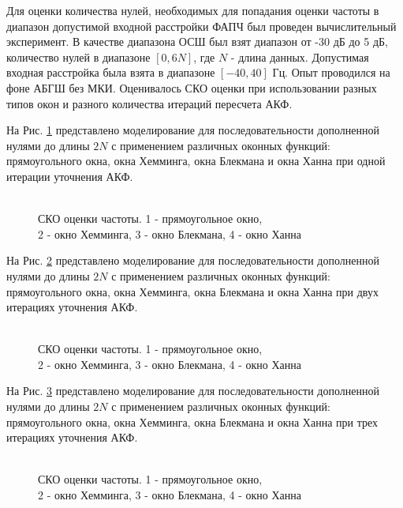 Для оценки количества нулей, необходимых для попадания оценки частоты в диапазон допустимой входной расстройки ФАПЧ был проведен вычислительный эксперимент. В качестве диапазона
ОСШ был взят диапазон от -30 дБ до 5 дБ, количество нулей в диапазоне ${[0, 6N]}$, где ${N}$ - длина данных. Допустимая входная расстройка была взята в диапазоне ${[-40, 40]}$ Гц.
Опыт проводился на фоне АБГШ без МКИ. Оценивалось СКО оценки при использовании разных типов окон и разного количества итераций пересчета АКФ.

На Рис. \ref{pic:fft2_1} представлено моделирование для последовательности дополненной нулями до длины ${2N}$ с применением различных оконных функций:
прямоугольного окна, окна Хемминга, окна Блекмана и окна Ханна при одной итерации уточнения АКФ.
\begin{figure}[h]
	\center{}
	\caption{\\СКО оценки частоты. 1 - прямоугольное окно,\\2 - окно Хемминга, 3 - окно Блекмана, 4 - окно Ханна}
	\label{pic:fft2_1}
\end{figure}

На Рис. \ref{pic:fft2_2} представлено моделирование для последовательности дополненной нулями до длины ${2N}$ с применением различных оконных функций:
прямоугольного окна, окна Хемминга, окна Блекмана и окна Ханна при двух итерациях уточнения АКФ.
\begin{figure}[h]
	\center{}
	\caption{\\СКО оценки частоты. 1 - прямоугольное окно,\\2 - окно Хемминга, 3 - окно Блекмана, 4 - окно Ханна}
	\label{pic:fft2_2}
\end{figure}

На Рис. \ref{pic:fft2_3} представлено моделирование для последовательности дополненной нулями до длины ${2N}$ с применением различных оконных функций:
прямоугольного окна, окна Хемминга, окна Блекмана и окна Ханна при трех итерациях уточнения АКФ.
\begin{figure}[h]
	\center{}
	\caption{\\СКО оценки частоты. 1 - прямоугольное окно,\\2 - окно Хемминга, 3 - окно Блекмана, 4 - окно Ханна}
	\label{pic:fft2_3}
\end{figure}

